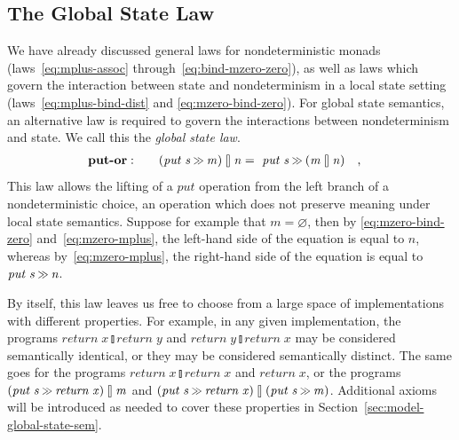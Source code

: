 \documentclass{jfp}
\newcommand{\Varid}[1]{\mathit{#1}}
\let\Varid\mathit
\begin{document}
\subsection{The Global State Law}
\label{sec:laws-global-state}
We have already discussed general laws for nondeterministic monads
(laws~\eqref{eq:mplus-assoc} through~\eqref{eq:bind-mzero-zero}),
as well as laws which govern the interaction between state and nondeterminism in
a local state setting (laws~\eqref{eq:mplus-bind-dist} and
\eqref{eq:mzero-bind-zero}).
For global state semantics, an alternative law is required to govern the
interactions between nondeterminism and state.
We call this the \emph{global state law}.
\begin{alignat}{2}
&\mbox{\bf put-or}:\quad&
  \ensuremath{(\Varid{put}\;\Varid{s}\mathbin{\hstretch{0.7}{>\!\!>}}\Varid{m})\mathbin{\talloblong}\Varid{n}} &=~ \ensuremath{\Varid{put}\;\Varid{s}\mathbin{\hstretch{0.7}{>\!\!>}}(\Varid{m}\mathbin{\talloblong}\Varid{n})}~ \mbox{~~,}
    \label{eq:put-or}
\end{alignat}
This law allows the lifting of a \ensuremath{\Varid{put}} operation from the left
branch of a nondeterministic choice, an operation which does not preserve
meaning under local state semantics.
Suppose for example that \ensuremath{\Varid{m}\mathrel{=}\Varid{\varnothing}}, then by
\eqref{eq:mzero-bind-zero} and~\eqref{eq:mzero-mplus}, the left-hand side of
the equation is equal to \ensuremath{\Varid{n}}, whereas by~\eqref{eq:mzero-mplus},
the right-hand side of the equation is equal to \ensuremath{\Varid{put}\;\Varid{s}\mathbin{\hstretch{0.7}{>\!\!>}}\Varid{n}}.

By itself, this law leaves us free to choose from a large space of
implementations with different properties.
For example, in any given implementation, the programs \ensuremath{\Varid{return}\;\Varid{x}\mathbin{\talloblong}\Varid{return}\;\Varid{y}} and
\ensuremath{\Varid{return}\;\Varid{y}\mathbin{\talloblong}\Varid{return}\;\Varid{x}} may be considered semantically identical, or they may be
considered semantically distinct.
The same goes for the programs \ensuremath{\Varid{return}\;\Varid{x}\mathbin{\talloblong}\Varid{return}\;\Varid{x}} and \ensuremath{\Varid{return}\;\Varid{x}},
or the programs \ensuremath{(\Varid{put}\;\Varid{s}\mathbin{\hstretch{0.7}{>\!\!>}}\Varid{return}\;\Varid{x})\mathbin{\talloblong}\Varid{m}} and
\ensuremath{(\Varid{put}\;\Varid{s}\mathbin{\hstretch{0.7}{>\!\!>}}\Varid{return}\;\Varid{x})\mathbin{\talloblong}(\Varid{put}\;\Varid{s}\mathbin{\hstretch{0.7}{>\!\!>}}\Varid{m})}.
Additional axioms will be introduced as needed to cover these properties in
Section~\ref{sec:model-global-state-sem}.
\end{document}
